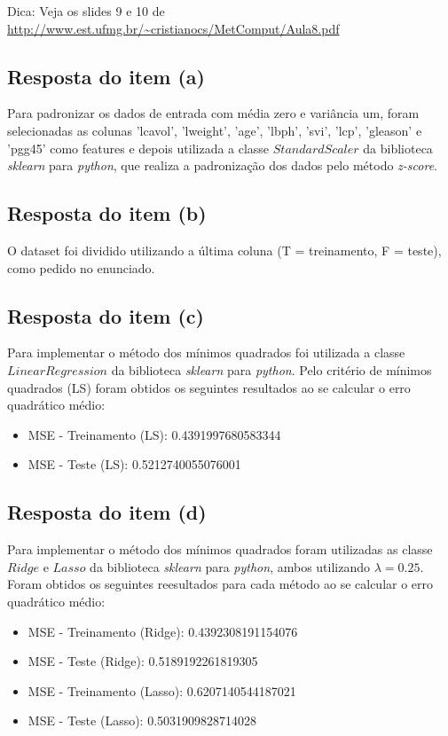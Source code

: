 Dica: Veja os slides 9 e 10 de \url{http://www.est.ufmg.br/~cristianocs/MetComput/Aula8.pdf}

\subsection{Resposta do item (a)}
Para padronizar os dados de entrada com média zero e variância um, foram selecionadas as colunas 'lcavol', 'lweight', 'age', 'lbph', 'svi', 'lcp', 'gleason' e 'pgg45' como features e depois utilizada a classe $StandardScaler$ da biblioteca  \textit{sklearn} para \textit{python}, que realiza a padronização dos dados pelo método \textit{z-score}.

\subsection{Resposta do item (b)}
O dataset foi dividido utilizando a última coluna (T = treinamento, F = teste), como pedido no enunciado.

\subsection{Resposta do item (c)}
Para implementar o método dos mínimos quadrados foi utilizada a classe $LinearRegression$ da biblioteca  \textit{sklearn} para \textit{python}.
Pelo critério de mínimos quadrados (LS) foram obtidos os seguintes resultados ao se calcular o erro quadrático médio:

\begin{itemize}
    \item MSE - Treinamento (LS): 0.4391997680583344
    \item  MSE - Teste (LS): 0.5212740055076001
\end{itemize}


\subsection{Resposta do item (d)}
Para implementar o método dos mínimos quadrados foram utilizadas as classe $Ridge$ e $Lasso$ da biblioteca \textit{sklearn} para \textit{python}, ambos utilizando $\lambda=0.25$.
Foram obtidos os seguintes reesultados para cada método ao se calcular o erro quadrático médio:

\begin{itemize}
    \item MSE - Treinamento (Ridge): 0.4392308191154076
    \item MSE - Teste (Ridge): 0.5189192261819305
    \item MSE - Treinamento (Lasso): 0.6207140544187021
    \item MSE - Teste (Lasso): 0.5031909828714028
\end{itemize}

